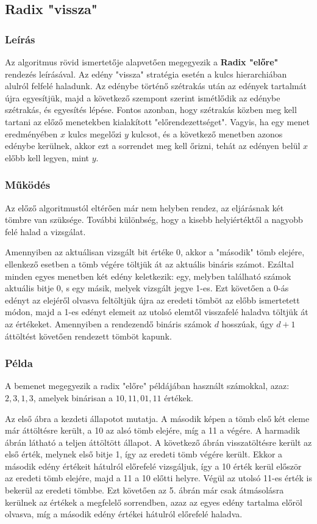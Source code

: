\documentclass{elteikthesis}
\newcommand{\hiddensubsubsection}[1]{
	\stepcounter{subsubsection}
	\subsubsection*{{#1}}	
}
\begin{document}
\subsection{Radix "vissza"}
\hiddensubsubsection{Leírás}
Az algoritmus rövid ismertetője alapvetően megegyezik a \textbf{Radix "előre"} rendezés leírásával. Az edény "vissza" stratégia esetén a kulcs hierarchiában alulról felfelé haladunk. Az edénybe történő szétrakás után az edények tartalmát újra egyesítjük, majd a következő szempont szerint ismétlődik az edénybe szétrakás, és egyesítés lépése. Fontos azonban, hogy szétrakás közben meg kell tartani az előző menetekben kialakított "előrendezettséget". Vagyis, ha egy menet eredményében $x$ kulcs megelőzi $y$ kulcsot, és a következő menetben azonos edénybe kerülnek, akkor ezt a sorrendet meg kell őrizni, tehát az edényen belül $x$ előbb kell legyen, mint $y$.
\hiddensubsubsection{Működés}
Az előző algoritmustól eltérően már nem helyben rendez, az eljárásnak két tömbre van szüksége. További különbség, hogy a kisebb helyiértéktől a nagyobb felé halad a vizsgálat.\par Amennyiben az aktuálisan vizsgált bit értéke 0, akkor a "második" tömb elejére, ellenkező esetben a tömb végére töltjük át az aktuális bináris számot. Ezáltal minden egyes menetben két edény keletkezik: egy, melyben található számok aktuális bitje 0, s egy másik, melyek vizsgált jegye 1-es. Ezt követően a 0-ás edényt az elejéről olvasva feltöltjük újra az eredeti tömböt az előbb ismertetett módon, majd a 1-es edényt elemeit az utolsó elemtől visszafelé haladva töltjük át az értékeket. Amennyiben a rendezendő bináris számok $d$ hosszúak, úgy $d+1$ áttöltést követően rendezett tömböt kapunk.
 \hiddensubsubsection{Példa}
 A bemenet megegyezik a radix "előre" példájában használt számokkal, azaz: $2, 3, 1, 3$, amelyek binárisan a $10, 11, 01, 11$ értékek.\par
 Az első ábra a kezdeti állapotot mutatja. A második képen a tömb első két eleme már áttöltésre került, a 10 az alsó tömb elejére, míg a 11 a végére. A harmadik ábrán látható a teljen áttöltött állapot. A következő ábrán visszatöltésre került az első érték, melynek első bitje 1, így az eredeti tömb végére került. Ekkor a második edény értékeit hátulról előrefelé vizsgáljuk, így a 10 érték kerül először az eredeti tömb elejére, majd a 11 a 10 előtti helyre. Végül az utolsó 11-es érték is bekerül az eredeti tömbbe. Ezt követően az 5. ábrán már csak átmásolásra kerülnek az értékek a megfelelő sorrendben, azaz az egyes edény tartalma előröl olvasva, míg a második edény értékei hátulról előrefelé haladva. \par
\end{document}
